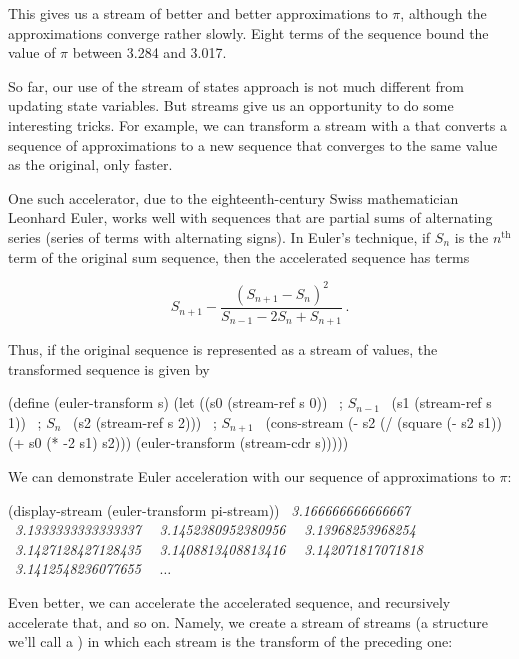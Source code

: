 \noindent
This gives us a stream of better and better approximations to \( \pi \),
although the approximations converge rather slowly.  Eight terms of the
sequence bound the value of \( \pi \) between 3.284 and 3.017.

So far, our use of the stream of states approach is not much different from
updating state variables.  But streams give us an opportunity to do some
interesting tricks.  For example, we can transform a stream with a
 that converts a sequence of approximations to a
new sequence that converges to the same value as the original, only faster.

One such accelerator, due to the eighteenth-century Swiss mathematician
Leonhard Euler, works well with sequences that are partial sums of alternating
series (series of terms with alternating signs).  In Euler's technique, if
\( S_n \) is the \( n^{\mathrm{th}} \) term of the original sum sequence, then the
accelerated sequence has terms

$$ S_{n+1} - {\frac{(S_{n+1} - S_n)^2}{S_{n-1} - 2S_n + S_{n+1}}}\,. $$

Thus, if the original sequence is represented as a stream of values, the
transformed sequence is given by

\begin{codeBlock}
(define (euler-transform s)
  (let ((s0 (stream-ref s 0))     ~\textrm{; \( S_{n-1} \)}~
        (s1 (stream-ref s 1))     ~\textrm{; \( S_n \)}~
        (s2 (stream-ref s 2)))    ~\textrm{; \( S_{n+1} \)}~
    (cons-stream (- s2 (/ (square (- s2 s1))
                          (+ s0 (* -2 s1) s2)))
                 (euler-transform (stream-cdr s)))))
\end{codeBlock}

\noindent
We can demonstrate Euler acceleration with our sequence of approximations to
\( \pi \):

\begin{codeBlock}
(display-stream (euler-transform pi-stream))
~\textit{3.166666666666667}~
~\textit{3.1333333333333337}~
~\textit{3.1452380952380956}~
~\textit{3.13968253968254}~
~\textit{3.1427128427128435}~
~\textit{3.1408813408813416}~
~\textit{3.142071817071818}~
~\textit{3.1412548236077655}~
~\( \dots \)~
\end{codeBlock}

\noindent
Even better, we can accelerate the accelerated sequence, and recursively
accelerate that, and so on.  Namely, we create a stream of streams (a structure
we'll call a ) in which each stream is the transform of the
preceding one:


